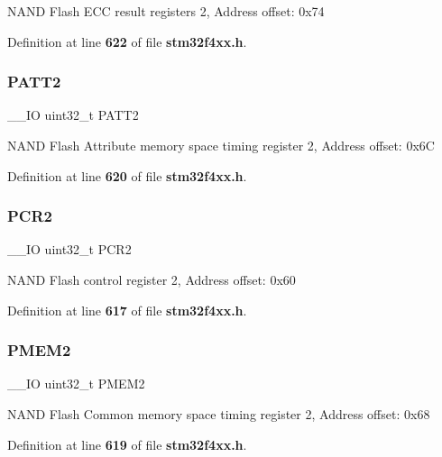 N\+A\+ND Flash E\+CC result registers 2, Address offset\+: 0x74 

Definition at line \textbf{ 622} of file \textbf{ stm32f4xx.\+h}.

\mbox{\label{structFSMC__Bank2__TypeDef_a9c1bc909ec5ed32df45444488ea6668b}} 
\subsubsection{P\+A\+T\+T2}
{\footnotesize\ttfamily \+\_\+\+\_\+\+IO uint32\+\_\+t P\+A\+T\+T2}

N\+A\+ND Flash Attribute memory space timing register 2, Address offset\+: 0x6C 

Definition at line \textbf{ 620} of file \textbf{ stm32f4xx.\+h}.

\mbox{\label{structFSMC__Bank2__TypeDef_ab0cb1d704ee64c62ad5be55522a2683a}} 
\subsubsection{P\+C\+R2}
{\footnotesize\ttfamily \+\_\+\+\_\+\+IO uint32\+\_\+t P\+C\+R2}

N\+A\+ND Flash control register 2, Address offset\+: 0x60 

Definition at line \textbf{ 617} of file \textbf{ stm32f4xx.\+h}.

\mbox{\label{structFSMC__Bank2__TypeDef_a2e5a7a96de68a6612affa6df8c309c3d}} 
\subsubsection{P\+M\+E\+M2}
{\footnotesize\ttfamily \+\_\+\+\_\+\+IO uint32\+\_\+t P\+M\+E\+M2}

N\+A\+ND Flash Common memory space timing register 2, Address offset\+: 0x68 

Definition at line \textbf{ 619} of file \textbf{ stm32f4xx.\+h}.

